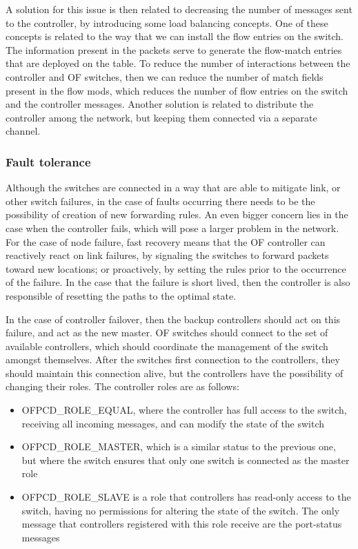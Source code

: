 \par A solution for this issue is then related to decreasing the number of messages sent to the controller, by introducing some load balancing concepts. One of
these concepts is related to the way that we can install the flow entries on the switch. The information present in the packets serve to generate the flow-match
entries that are deployed on the table. To reduce the number of interactions between the controller and OF switches, then we can reduce the number of match fields
present in the flow mods, which reduces the number of flow entries on the switch and the controller messages. Another solution is related to distribute the 
controller among the network, but keeping them connected via a separate channel.

\subsubsection {Fault tolerance} \label{sec:fault_tolerance}

Although the switches are connected in a way that are able to mitigate link, or other switch failures, in the case of faults occurring there needs to be the
possibility of creation of new forwarding rules. An even bigger concern lies in the case when the controller fails, which will pose a larger problem in the network. 
For the case of node failure, fast recovery means that the OF controller can reactively react on link failures, by signaling the switches to forward packets toward 
new locations; or proactively, by setting the rules prior to the occurrence of the failure. In the case that the failure is short lived, then the controller is also 
responsible of resetting the paths to the optimal state.

\par In the case of controller failover, then the backup controllers should act on this failure, and act as the new master. OF switches should connect to the set of
available controllers, which should coordinate the management of the switch amongst themselves. After the switches first connection to the controllers, they should
maintain this connection alive, but the controllers have the possibility of changing their roles. The controller roles are as follows:

\begin {itemize}
    \item \textsc {OFPCD\_ROLE\_EQUAL}, where the controller has full access to the switch, receiving all incoming messages, and can modify the state of the switch
    \item \textsc {OFPCD\_ROLE\_MASTER}, which is a similar status to the previous one, but where the switch ensures that only one switch is connected as the master
        role
    \item \textsc {OFPCD\_ROLE\_SLAVE} is a role that controllers has read-only access to the switch, having no permissions for altering the state of the switch.
        The only message that controllers registered with this role receive are the port-status messages
\end {itemize}

